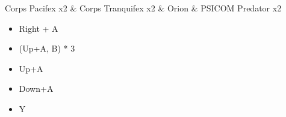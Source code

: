 	\begin{battle}[0:17]{Corps Pacifex x2 \& Corps Tranquifex x2 \& Orion \& PSICOM Predator x2}
		\begin{itemize}
			\item Right + A
			\item (Up+A, B) * 3
			\item Up+A
			\item Down+A
			\item Y
		\end{itemize}
		   
	\end{battle}